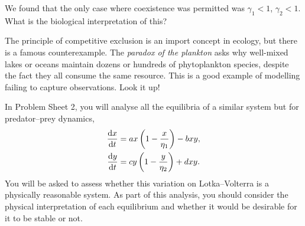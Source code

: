 \documentclass[main.tex]{subfiles}
\begin{document}
\begin{do-it-yourself}
	We found that the only case where coexistence was permitted was $\gamma_1<1$, $\gamma_2<1$. What is the biological interpretation of this?
\end{do-it-yourself}

\begin{nem}
	The principle of competitive exclusion is an import concept in ecology, but there is a famous counterexample. The \emph{paradox of the plankton} asks why well-mixed lakes or oceans maintain dozens or hundreds of phytoplankton species, despite the fact they all consume the same resource. This is a good example of modelling failing to capture observations. Look it up!
\end{nem}

\begin{do-it-yourself}
In Problem Sheet 2, you will analyse all the equilibria of a similar system but for predator--prey dynamics,
\begin{subequations}
\begin{align}
\fd{x}{t}  &= a x\left(1-\frac{x}{\eta_1}\right) - b x y,\\
\fd{y}{t}  &= c y\left(1-\frac{y}{\eta_2}\right) + d x y.
\end{align}
\end{subequations}
You will be asked to assess whether this variation on Lotka--Volterra is a physically reasonable system. As part of this analysis, you should consider the physical interpretation of each equilibrium and whether it would be desirable for it to be stable or not. 
\end{do-it-yourself}
\end{document}
